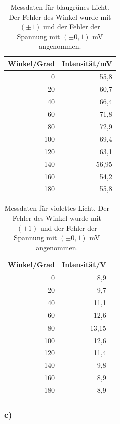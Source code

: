 \documentclass[12pt]{scrartcl}
\begin{document}
\begin{table}[htbp]
\caption{Messdaten für blaugrünes Licht. Der Fehler des Winkel wurde mit $(\pm 1)$ und der Fehler der Spannung mit $(\pm 0,1)$ mV angenommen.}
\begin{center}
\begin{tabular}{|r|r|}
\hline
\multicolumn{1}{|l|}{Winkel/Grad} & \multicolumn{1}{l|}{Intensität/mV} \\ \hline
0 & 55,8 \\ \hline
20 & 60,7 \\ \hline
40 & 66,4 \\ \hline
60 & 71,8 \\ \hline
80 & 72,9 \\ \hline
100 & 69,4 \\ \hline
120 & 63,1 \\ \hline
140 & 56,95 \\ \hline
160 & 54,2 \\ \hline
180 & 55,8 \\ \hline
\end{tabular}
\end{center}
\label{tab:a_5_b_gg}
\end{table}

\begin{table}[htbp]
\caption{Messdaten für violettes Licht. Der Fehler des Winkel wurde mit $(\pm 1)$ und der Fehler der Spannung mit $(\pm 0,1)$ mV angenommen.}
\begin{center}
\begin{tabular}{|r|r|}
\hline
\multicolumn{1}{|l|}{Winkel/Grad} & \multicolumn{1}{l|}{Intensität/V} \\ \hline
0 & 8,9 \\ \hline
20 & 9,7 \\ \hline
40 & 11,1 \\ \hline
60 & 12,6 \\ \hline
80 & 13,15 \\ \hline
100 & 12,6 \\ \hline
120 & 11,4 \\ \hline
140 & 9,8 \\ \hline
160 & 8,9 \\ \hline
180 & 8,9 \\ \hline
\end{tabular}
\end{center}
\label{tab:a_5_b_gg}
\end{table}

\subsubsection{c)}
\end{document}
